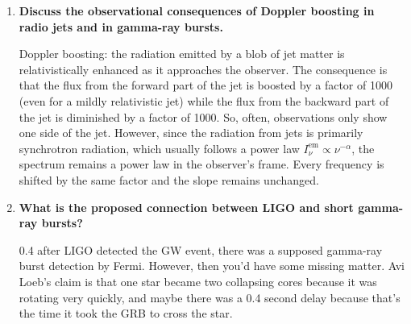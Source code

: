 \documentclass[a4paper]{article}
\begin{document}
\begin{enumerate}
\item \textbf{Discuss the observational consequences of Doppler boosting in radio jets and in gamma-ray bursts.}

Doppler boosting: the radiation emitted by a blob of jet matter is relativistically enhanced as it approaches the observer. The consequence is that the flux from the forward part of the jet is boosted by a factor of 1000 (even for a mildly relativistic jet) while the flux from the backward part of the jet is diminished by a factor of 1000. So, often, observations only show one side of the jet. However, since the radiation from jets is primarily synchrotron radiation, which usually follows a power law $I_\nu^{\mathrm{em}} \propto \nu^{-\alpha}$, the spectrum remains a power law in the observer's frame. Every frequency is shifted by the same factor and the slope remains unchanged. 

\item \textbf{What is the proposed connection between LIGO and short gamma-ray bursts?}

0.4 after LIGO detected the GW event, there was a supposed gamma-ray burst detection by Fermi. However, then you'd have some missing matter. Avi Loeb's claim is that one star became two collapsing cores because it was rotating very quickly, and maybe there was a 0.4 second delay because that's the time it took the GRB to cross the star. 

\end{enumerate}
\end{document}
